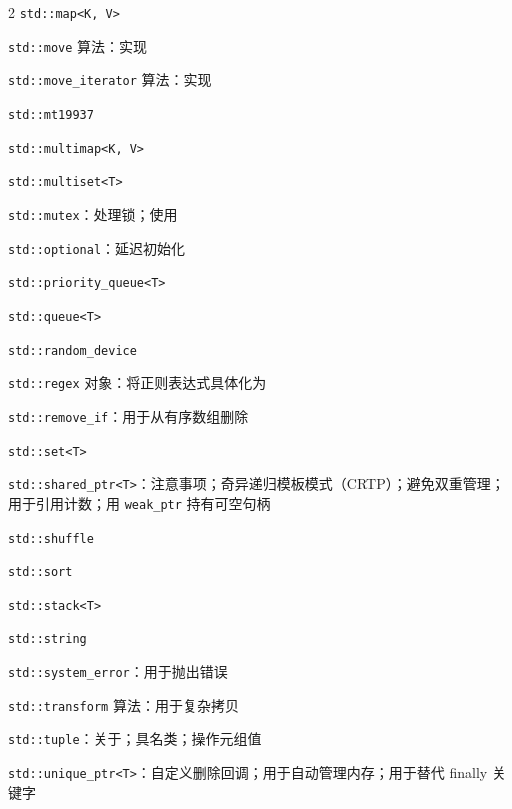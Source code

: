 \begin{multicols}{2}
\noindent \texttt{std::\allowbreak{}map<\allowbreak{}K,\allowbreak{} V>\allowbreak{}}\par
\noindent \texttt{std::\allowbreak{}move} 算法：实现\par
\noindent \texttt{std::\allowbreak{}move\_\allowbreak{}iterator} 算法：实现\par
\noindent \texttt{std::\allowbreak{}mt19937}\par
\noindent \texttt{std::\allowbreak{}multimap<\allowbreak{}K,\allowbreak{} V>\allowbreak{}}\par
\noindent \texttt{std::\allowbreak{}multiset<\allowbreak{}T>\allowbreak{}}\par
\noindent \texttt{std::\allowbreak{}mutex}：处理锁；使用\par
\noindent \texttt{std::\allowbreak{}optional}：延迟初始化\par
\noindent \texttt{std::\allowbreak{}priority\_\allowbreak{}queue<\allowbreak{}T>\allowbreak{}}\par
\noindent \texttt{std::\allowbreak{}queue<\allowbreak{}T>\allowbreak{}}\par
\noindent \texttt{std::\allowbreak{}random\_\allowbreak{}device}\par
\noindent \texttt{std::\allowbreak{}regex} 对象：将正则表达式具体化为\par
\noindent \texttt{std::\allowbreak{}remove\_\allowbreak{}if}：用于从有序数组删除\par
\noindent \texttt{std::\allowbreak{}set<\allowbreak{}T>\allowbreak{}}\par
\noindent \texttt{std::\allowbreak{}shared\_\allowbreak{}ptr<\allowbreak{}T>\allowbreak{}}：注意事项；奇异递归模板模式（CRTP）；避免双重管理；用于引用计数；用 \texttt{weak\_\allowbreak{}ptr} 持有可空句柄\par
\noindent \texttt{std::\allowbreak{}shuffle}\par
\noindent \texttt{std::\allowbreak{}sort}\par
\noindent \texttt{std::\allowbreak{}stack<\allowbreak{}T>\allowbreak{}}\par
\noindent \texttt{std::\allowbreak{}string}\par
\noindent \texttt{std::\allowbreak{}system\_\allowbreak{}error}：用于抛出错误\par
\noindent \texttt{std::\allowbreak{}transform} 算法：用于复杂拷贝\par
\noindent \texttt{std::\allowbreak{}tuple}：关于；具名类；操作元组值\par
\noindent \texttt{std::\allowbreak{}unique\_\allowbreak{}ptr<\allowbreak{}T>\allowbreak{}}：自定义删除回调；用于自动管理内存；用于替代 finally 关键字\par

\end{multicols}
